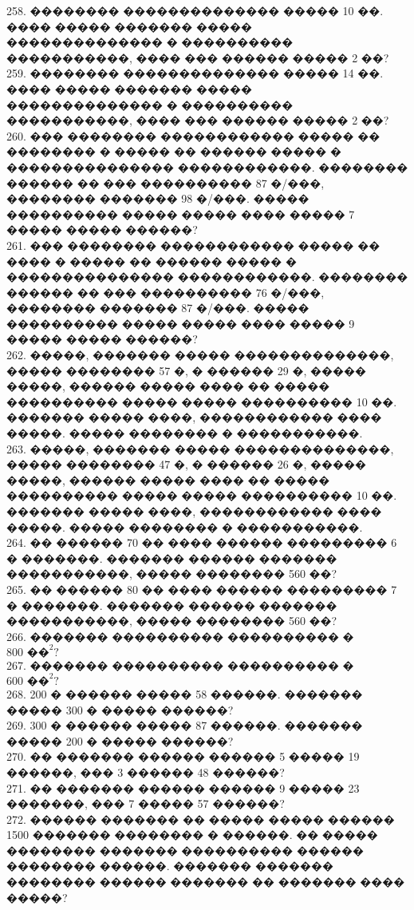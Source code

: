 \documentclass[12pt]{article}
\begin{document}
258. �������� �������������� ����� 10 ��. ���� ����� ������� ����� �������������� � ���������� �����������, ���� ��� ������ ����� 2 ��?\\
259. �������� �������������� ����� 14 ��. ���� ����� ������� ����� �������������� � ���������� �����������, ���� ��� ������ ����� 2 ��?\\
260. ��� �������� ������������ ����� �� �������� � ����� �� ������ ����� � ��������������� ������������. �������� ������ �� ��� ���������� 87 �/���, �������� ������� 98 �/���. ����� ���������� ����� ����� ���� ����� 7 ����� ����� ������?\\
261. ��� �������� ������������ ����� �� ���� � ����� �� ������ ����� � ��������������� ������������. �������� ������ �� ��� ���������� 76 �/���, �������� ������� 87 �/���. ����� ���������� ����� ����� ���� ����� 9 ����� ����� ������?\\
262. �����, ������� ����� ��������������, ����� �������� 57 �, � ������ 29 �, ����� �����, ������ ����� ���� �� ����� ���������� ����� ����� ���������� 10 ��. ������� ����� ����, ������������ ���� �����. ����� �������� � �����������.\\
263. �����, ������� ����� ��������������, ����� �������� 47 �, � ������ 26 �, ����� �����, ������ ����� ���� �� ����� ���������� ����� ����� ���������� 10 ��. ������� ����� ����, ������������ ���� �����. ����� �������� � �����������.\\
264. �� ������ 70 �� ���� ������ ��������� 6 � �������. ������� ������ ������� �����������, ����� �������� 560 ��?\\
265. �� ������ 80 �� ���� ������ ��������� 7 � �������. ������� ������ ������� �����������, ����� �������� 560 ��?\\
266. ������� ���������� ���������� � $800\text{ ��}^2?$\\
267. ������� ���������� ���������� � $600\text{ ��}^2?$\\
268. 200 � ������ ����� 58 ������. ������� ����� 300 � ����� ������?\\
269. 300 � ������ ����� 87 ������. ������� ����� 200 � ����� ������?\\
270. �� ������� ������ ������ 5 ����� 19 ������, ��� 3 ������ 48 ������?\\
271. �� ������� ������ ������ 9 ����� 23 �������, ��� 7 ����� 57 ������?\\
272. ������ ������� �� ����� ����� ������ 1500 ������� �������� � ������. �� ����� �������� ������� ���������� ������ �������� ������. ������� ������� �������� ������ ������� �� ������� ���� �����?\\
\end{document}
